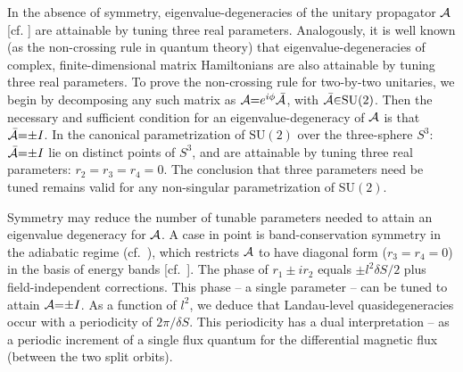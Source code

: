 \documentclass[aps, showpacs, twocolumn, notitlepage, superscriptaddress]{revtex4-1}
\begin{document}
In the absence of symmetry, eigenvalue-degeneracies of the unitary propagator ${\cal A}$ [cf. ] are attainable by tuning three real parameters. Analogously, it is well known (as the non-crossing rule in quantum theory\cite{neumann2000behaviour}) that eigenvalue-degeneracies of complex, finite-dimensional matrix Hamiltonians are also attainable by tuning three real parameters.
To prove the non-crossing rule for two-by-two unitaries, we begin by decomposing any such matrix as ${\cal A}{=}e^{i\phi}{\cal \bar{A}}$, with  ${\cal \bar{A}}{\in}\text{SU}(2)$. Then the necessary and sufficient condition for an eigenvalue-degeneracy of ${\cal A}$ is that ${\cal \bar{A}}{=}{\pm}I$. In the canonical parametrization of $\text{SU}(2)$ over the three-sphere $S^3$: 
${\cal \bar{A}}{=}{\pm}I$ lie on distinct points of $S^3$, and are attainable by tuning three real parameters: $r_2{=}r_3{=}r_4{=}0$. The conclusion that three parameters need be tuned remains valid for any  non-singular parametrization of SU$(2)$.
 
Symmetry may reduce the number of tunable parameters needed to attain an eigenvalue degeneracy for ${\cal A}$. A case in point is band-conservation symmetry in the adiabatic regime (cf.\ ), which restricts ${\cal A}$ to have diagonal form  ($r_3{=}r_4{=}0$) in the basis of energy bands [cf.\ ]. The phase of $r_1{\pm}ir_2$ equals ${\pm} l^2\delta S/2$ plus field-independent corrections. This  phase -- a single parameter --  can be  tuned to attain ${\cal A}{=}{\pm}I$. As a function of $l^2$, we deduce that Landau-level quasidegeneracies occur with a periodicity of $2\pi/\delta S$. This periodicity  has a dual interpretation -- as a periodic increment of a single flux quantum for the differential magnetic flux (between the two split orbits).
\end{document}
